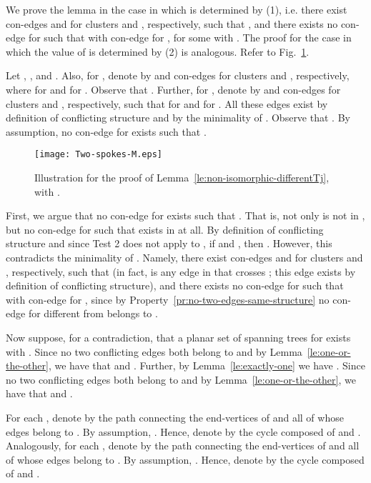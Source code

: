 \documentclass[letter,runningheads]{llncs}
\renewenvironment{proof}
{{\em Proof.\ }}{\hspace*{\fill}\par\vspace{2mm}}
\begin{document}
\begin{proof}
We prove the lemma in the case in which  is determined by (1), i.e. there exist con-edges  and  for clusters  and , respectively, such that , and there exists no con-edge  for  such that  with  con-edge for , for some  with . The proof for the case in which the value of  is determined by (2) is analogous. Refer to Fig.~\ref{fig:two-spokes}.

Let , , and . Also, for , denote by  and  con-edges for clusters  and , respectively, where  for  and  for . Observe that . Further, for , denote by  and  con-edges for clusters  and , respectively, such that  for  and  for . All these edges exist by definition of conflicting structure and by the minimality of . Observe that .  By assumption, no con-edge  for  exists such that .

\begin{figure}[tb]
\begin{center}
\mbox{\texttt{[image: Two-spokes-M.eps]}}
\caption{Illustration for the proof of Lemma~\ref{le:non-isomorphic-differentTj}, with .}
\label{fig:two-spokes}
\end{center}
\end{figure}

First, we argue that no con-edge  for  exists such that . That is, not only  is not in , but no con-edge  for  such that  exists in  at all. By definition of conflicting structure and since {\sc Test 2} does not apply to , if  and , then . However, this contradicts the minimality of . Namely,  there exist con-edges  and  for clusters  and , respectively, such that  (in fact,  is any edge in  that crosses ; this edge exists by definition of conflicting structure), and there exists no con-edge  for  such that  with  con-edge for , since by Property~\ref{pr:no-two-edges-same-structure} no con-edge for  different from  belongs to .

Now suppose, for a contradiction, that a planar set  of spanning trees for  exists with . Since no two conflicting edges both belong to  and by Lemma~\ref{le:one-or-the-other}, we have that  and . Further, by Lemma~\ref{le:exactly-one} we have . Since no two conflicting edges both belong to  and by Lemma~\ref{le:one-or-the-other}, we have that  and .

For each , denote by  the path connecting the end-vertices of  and all of whose edges belong to . By assumption, . Hence, denote by  the cycle composed of  and . Analogously, for each , denote by  the path connecting the end-vertices of  and all of whose edges belong to . By assumption, . Hence, denote by  the cycle composed of  and .


\end{proof}
\end{document}
